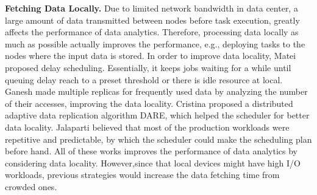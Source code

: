 \documentclass[conference]{IEEEtran}
\begin{document}
\textbf{Fetching Data Locally.} Due to limited network bandwidth in data center, a large amount of data transmitted between nodes before task execution, greatly affects the performance of data analytics. Therefore, processing data locally as much as possible actually improves the performance, e.g., deploying tasks to the nodes where the input data is stored. 
In order to improve data locality, Matei \cite{b2} proposed delay scheduling. Essentially, it keeps jobs waiting for a while until queuing delay reach to a preset threshold or there is idle resource at local.
Ganesh \cite{b3} made multiple replicas for frequently used data by analyzing the number of their accesses, improving the data locality. 
Cristina \cite{b4} proposed a distributed adaptive data replication algorithm DARE, which helped the scheduler for better data locality. 
Jalaparti \cite{b5} believed that most of the production workloads were repetitive and predictable, by which the scheduler could make the scheduling plan before hand. 
All of these works improves the performance of data analytics by considering data locality. 
However,since that local devices might have high I/O workloads, previous strategies would increase the data fetching time from crowded ones.
\end{document}
